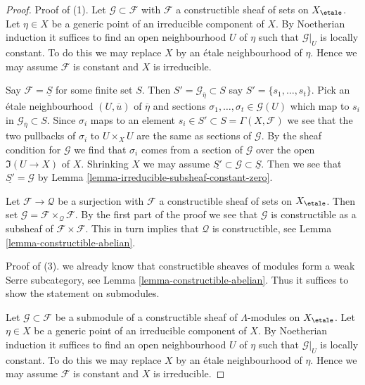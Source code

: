 \begin{proof}
Proof of (1). Let $\mathcal{G} \subset \mathcal{F}$ with $\mathcal{F}$
a constructible sheaf of sets on $X_\etale$. Let $\eta \in X$ be a generic
point of an irreducible component of $X$. By Noetherian induction
it suffices to find an open neighbourhood $U$ of $\eta$ such that
$\mathcal{G}|_U$ is locally constant. To do this we may replace $X$
by an \'etale neighbourhood of $\eta$.
Hence we may assume $\mathcal{F}$ is constant and $X$ is irreducible.

\medskip\noindent
Say $\mathcal{F} = \underline{S}$ for some finite set $S$.
Then $S' = \mathcal{G}_{\overline{\eta}} \subset S$
say $S' = \{s_1, \ldots, s_t\}$.
Pick an \'etale neighbourhood $(U, \overline{u})$ of $\overline{\eta}$
and sections $\sigma_1, \ldots, \sigma_t \in \mathcal{G}(U)$ which map to
$s_i$ in $\mathcal{G}_{\overline{\eta}} \subset S$.
Since $\sigma_i$ maps to an element
$s_i \in S' \subset S = \Gamma(X, \mathcal{F})$
we see that the two pullbacks of $\sigma_i$ to $U \times_X U$
are the same as sections of $\mathcal{G}$. By the sheaf condition
for $\mathcal{G}$ we find that $\sigma_i$ comes from a section
of $\mathcal{G}$ over the open $\Im(U \to X)$ of $X$.
Shrinking $X$ we may assume
$\underline{S'} \subset \mathcal{G} \subset \underline{S}$.
Then we see that $\underline{S'} = \mathcal{G}$ by
Lemma \ref{lemma-irreducible-subsheaf-constant-zero}.

\medskip\noindent
Let $\mathcal{F} \to \mathcal{Q}$ be a surjection with $\mathcal{F}$
a constructible sheaf of sets on $X_\etale$. Then set
$\mathcal{G} = \mathcal{F} \times_\mathcal{Q} \mathcal{F}$.
By the first part of the proof we see that $\mathcal{G}$ is
constructible as a subsheaf of $\mathcal{F} \times \mathcal{F}$.
This in turn implies that $\mathcal{Q}$ is constructible, see
Lemma \ref{lemma-constructible-abelian}.

\medskip\noindent
Proof of (3). we already know that constructible sheaves of modules
form a weak Serre subcategory, see Lemma \ref{lemma-constructible-abelian}.
Thus it suffices to show the statement on submodules.

\medskip\noindent
Let $\mathcal{G} \subset \mathcal{F}$ be a submodule of a
constructible sheaf of $\Lambda$-modules on $X_\etale$. Let $\eta \in X$
be a generic point of an irreducible component of $X$. By Noetherian induction
it suffices to find an open neighbourhood $U$ of $\eta$ such that
$\mathcal{G}|_U$ is locally constant. To do this we may replace $X$
by an \'etale neighbourhood of $\eta$. Hence we may assume $\mathcal{F}$
is constant and $X$ is irreducible.


\end{proof}
